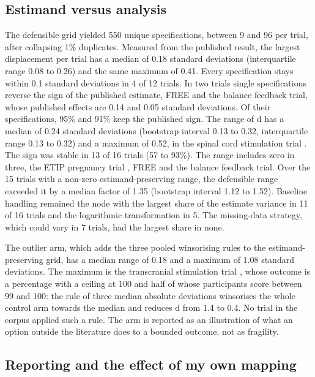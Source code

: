 \subsection{Estimand versus analysis}\label{estimand-versus-analysis}

The defensible grid yielded 550 unique specifications, between 9 and 96 per trial, after collapsing 1\% duplicates. Measured from the published result, the largest displacement per trial has a median of 0.18 standard deviations (interquartile range 0.08 to 0.26) and the same maximum of 0.41. Every specification stays within 0.1 standard deviations in 4 of 12 trials. In two trials single specifications reverse the sign of the published estimate, FREE and the balance feedback trial, whose published effects are 0.14 and 0.05 standard deviations. Of their specifications, 95\% and 91\% keep the published sign. The range of d has a median of 0.24 standard deviations (bootstrap interval 0.13 to 0.32, interquartile range 0.13 to 0.32) and a maximum of 0.52, in the spinal cord stimulation trial \cite{Rashad_2026}. The sign was stable in 13 of 16 trials (57 to 93\%). The range includes zero in three, the ETIP pregnancy trial \cite{Garnaes_2019}, FREE and the balance feedback trial. Over the 15 trials with a non-zero estimand-preserving range, the defensible range exceeded it by a median factor of 1.35 (bootstrap interval 1.12 to 1.52). Baseline handling remained the node with the largest share of the estimate variance in 11 of 16 trials and the logarithmic transformation in 5. The missing-data strategy, which could vary in 7 trials, had the largest share in none.

The outlier arm, which adds the three pooled winsorising rules to the estimand-preserving grid, has a median range of 0.18 and a maximum of 1.08 standard deviations. The maximum is the transcranial stimulation trial \cite{Esfahani_2026}, whose outcome is a percentage with a ceiling at 100 and half of whose participants score between 99 and 100: the rule of three median absolute deviations winsorises the whole control arm towards the median and reduces d from 1.4 to 0.4. No trial in the corpus applied such a rule. The arm is reported as an illustration of what an option outside the literature does to a bounded outcome, not as fragility.

\subsection{Reporting and the effect of my own mapping}\label{reporting-and-the-effect-of-my-own-mapping}

